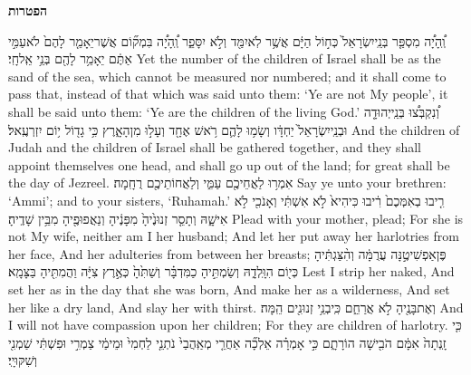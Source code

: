 \vspace{24pt}\LARGE \textbf{הפטרות} \normalsize\vspace{-16pt}
\label{haft_34}
\setcounter{chap}{2}
\setcounter{verse}{1}
{וְֽ֠הָיָ֠ה מִסְפַּ֤ר בְּנֵֽי\maqqaf יִשְׂרָאֵל֙ כְּח֣וֹל הַיָּ֔ם אֲשֶׁ֥ר לֹֽא\maqqaf יִמַּ֖ד וְלֹ֣א יִסָּפֵ֑ר וְֽ֠הָיָ֠ה בִּמְק֞וֹם אֲשֶׁר\maqqaf יֵאָמֵ֤ר לָהֶם֙ לֹא\maqqaf עַמִּ֣י אַתֶּ֔ם יֵאָמֵ֥ר לָהֶ֖ם בְּנֵ֥י אֵֽל\maqqaf חָֽי׃}
{Yet the number of the children of Israel shall be as the sand of the sea, which cannot be measured nor numbered; and it shall come to pass that, instead of that which was said unto them: ‘Ye are not My people’, it shall be said unto them: ‘Ye are the children of the living God.’}
{וְ֠נִקְבְּצ֠וּ בְּנֵֽי\maqqaf יְהוּדָ֤ה וּבְנֵֽי\maqqaf יִשְׂרָאֵל֙ יַחְדָּ֔ו וְשָׂמ֥וּ לָהֶ֛ם רֹ֥אשׁ אֶחָ֖ד וְעָל֣וּ מִן\maqqaf הָאָ֑רֶץ כִּ֥י גָד֖וֹל י֥וֹם יִזְרְעֶֽאל׃}
{And the children of Judah and the children of Israel shall be gathered together, and they shall appoint themselves one head, and shall go up out of the land; for great shall be the day of Jezreel.}
{אִמְר֥וּ לַאֲחֵיכֶ֖ם עַמִּ֑י וְלַאֲחוֹתֵיכֶ֖ם רֻחָֽמָה׃}
{Say ye unto your brethren: ‘Ammi’; and to your sisters, ‘Ruhamah.’}
{רִ֤יבוּ בְאִמְּכֶם֙ רִ֔יבוּ כִּי\maqqaf הִיא֙ לֹ֣א אִשְׁתִּ֔י וְאָנֹכִ֖י לֹ֣א אִישָׁ֑הּ וְתָסֵ֤ר זְנוּנֶ֙יהָ֙ מִפָּנֶ֔יהָ וְנַאֲפוּפֶ֖יהָ מִבֵּ֥ין שָׁדֶֽיהָ׃}
{Plead with your mother, plead; For she is not My wife, neither am I her husband; And let her put away her harlotries from her face, And her adulteries from between her breasts;}
{פֶּן\maqqaf אַפְשִׁיטֶ֣נָּה עֲרֻמָּ֔ה וְהִ֨צַּגְתִּ֔יהָ כְּי֖וֹם הִוָּֽלְדָ֑הּ וְשַׂמְתִּ֣יהָ כַמִּדְבָּ֗ר וְשַׁתִּ֙הָ֙ כְּאֶ֣רֶץ צִיָּ֔ה וַהֲמִתִּ֖יהָ בַּצָּמָֽא׃}
{Lest I strip her naked, And set her as in the day that she was born, And make her as a wilderness, And set her like a dry land, And slay her with thirst.}
{וְאֶת\maqqaf בָּנֶ֖יהָ לֹ֣א אֲרַחֵ֑ם כִּֽי\maqqaf בְנֵ֥י זְנוּנִ֖ים הֵֽמָּה׃}
{And I will not have compassion upon her children; For they are children of harlotry.}
{כִּ֤י זָֽנְתָה֙ אִמָּ֔ם הֹבִ֖ישָׁה הוֹרָתָ֑ם כִּ֣י אָמְרָ֗ה אֵלְכָ֞ה אַחֲרֵ֤י מְאַֽהֲבַי֙ נֹתְנֵ֤י לַחְמִי֙ וּמֵימַ֔י צַמְרִ֣י וּפִשְׁתִּ֔י שַׁמְנִ֖י וְשִׁקּוּיָֽי׃}
